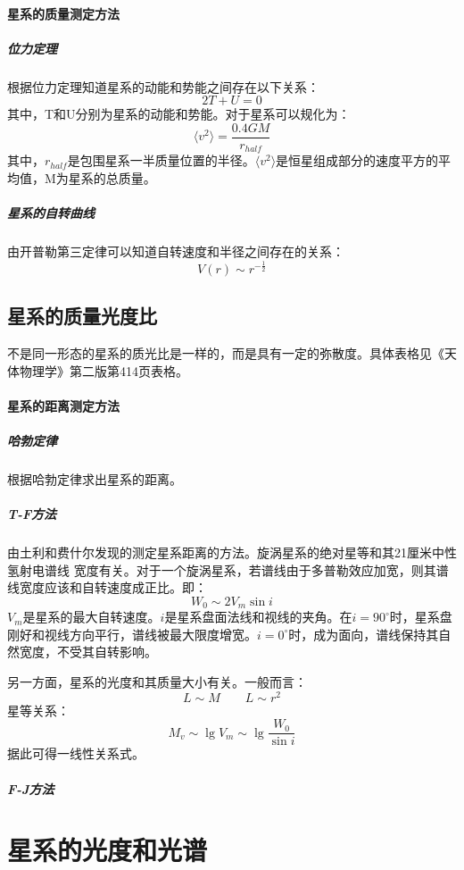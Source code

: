 \paragraph{星系的质量测定方法}
\subparagraph{位力定理}
根据位力定理知道星系的动能和势能之间存在以下关系：
\begin{equation}
	2T+U=0
\end{equation}
其中，T和U分别为星系的动能和势能。对于星系可以规化为：
\begin{equation}
	\langle v^2\rangle=\frac{0.4GM}{r_{half}}
\end{equation}
其中，$r_{half}$是包围星系一半质量位置的半径。$\langle v^2\rangle$是恒星组成部分的速度平方的平均值，M为星系的总质量。
\subparagraph{星系的自转曲线}
由开普勒第三定律可以知道自转速度和半径之间存在的关系：
\begin{equation}
	V(r)\sim r^{-\frac{1}{2}}
\end{equation}
\subsection{星系的质量光度比}不是同一形态的星系的质光比是一样的，而是具有一定的弥散度。具体表格见《天体物理学》第二版第414页表格。
\paragraph{星系的距离测定方法}
\subparagraph{哈勃定律}根据哈勃定律求出星系的距离。
\subparagraph{T-F方法}由土利和费什尔发现的测定星系距离的方法。旋涡星系的绝对星等和其21厘米中性氢射电谱线 宽度有关。对于一个旋涡星系，若谱线由于多普勒效应加宽，则其谱线宽度应该和自转速度成正比。即：
\begin{equation}
	W_{0}\sim2V_{m}\sin i
\end{equation}
$V_{m}$是星系的最大自转速度。$i$是星系盘面法线和视线的夹角。在$i=90^\circ$时，星系盘刚好和视线方向平行，谱线被最大限度增宽。$i=0^\circ$时，成为面向，谱线保持其自然宽度，不受其自转影响。

另一方面，星系的光度和其质量大小有关。一般而言：
\begin{equation}
	L\sim M\qquad L\sim r^2
\end{equation}
星等关系：
\begin{equation}
	M_{v}\sim \lg V_{m}\sim\lg\frac{W_{0}}{\sin i}
\end{equation}
据此可得一线性关系式。
\subparagraph{F-J方法}

\section{星系的光度和光谱}
